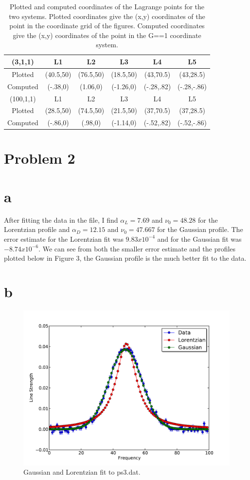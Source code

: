 \documentclass[a4paper,11pt]{article}
\begin{document}
\begin{table}[h!]
\begin{center}
\begin{tabular}{|c||c|c|c|c|c|}
\hline
 (3,1,1)&L1&L2&L3&L4&L5\\
\hline
 Plotted& (40.5,50)& (76.5,50) & (18.5,50) & (43,70.5) & (43,28.5)\\
 Computed& (-.38,0)& (1.06,0) & (-1.26,0) & (-.28,.82) & (-.28,-.86)\\
\hline
\hline
 (100,1,1)&L1&L2&L3&L4&L5\\
\hline
 Plotted& (28.5,50)& (74.5,50) & (21.5,50) & (37,70.5) & (37,28.5)\\
 Computed& (-.86,0)& (.98,0) & (-1.14,0) & (-.52,.82) & (-.52,-.86)\\
\hline
\end{tabular}
\end{center}
\caption{Plotted and computed coordinates of the Lagrange points for the two systems.  Plotted coordinates give the (x,y) coordinates of the point in the coordinate grid of the figures.  Computed coordinates give the (x,y) coordinates of the point in the G==1 coordinate system.}
\end{table}


\section*{Problem 2}
\section*{a}
After fitting the data in the file, I find $\alpha_{L}=7.69$ and $\nu_{0}=48.28$ for the Lorentzian profile and $\alpha_{D}=12.15$ and $\nu_{0}=47.667$ for the Gaussian profile.  The error estimate for the Lorentzian fit was $9.83x10^{-4}$ and for the Gaussian fit was $-8.74x10^{-6}$.  We can see from both the smaller error estimate and the profiles plotted below in Figure 3, the Gaussian profile is the much better fit to the data.
\section*{b}
\begin{figure}[!h]
\begin{center}
\includegraphics[scale=.7]{fit.pdf}
\caption{Gaussian and Lorentzian fit to ps3.dat.}
\end{center}
\end{figure}
\end{document}
